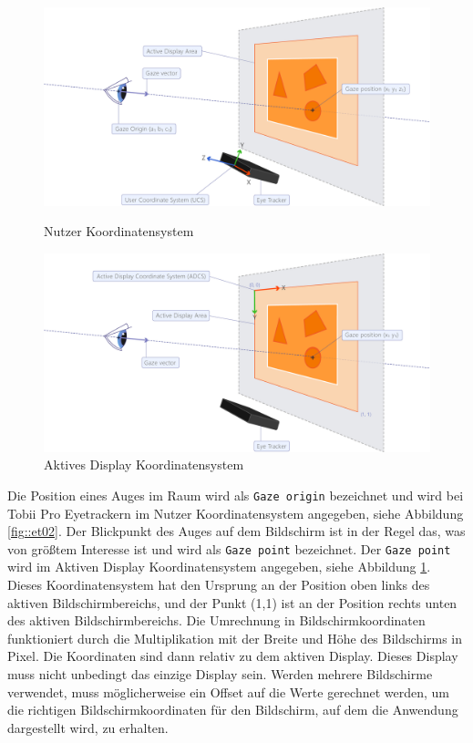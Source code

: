 \begin{figure}[]
	\centering
	\begin{minipage}[b]{0.49\textwidth}
		\centering
		\includegraphics[width=1\textwidth]{../../Grafiken/UCS.png}
		\caption{Nutzer Koordinatensystem \cite{tobiisdk}}
		\label{fig::et02}
	\end{minipage}
	\hfill
	\begin{minipage}[b]{0.49\textwidth}
		\centering
		\includegraphics[width=1\textwidth]{../../Grafiken/ADCS.png}
		\caption{Aktives Display Koordinatensystem \cite{tobiisdk}}
		\label{fig::et03}
	\end{minipage}
\end{figure}
Die Position eines Auges im Raum wird als \texttt{Gaze origin} bezeichnet und wird bei Tobii Pro Eyetrackern im Nutzer Koordinatensystem angegeben, siehe Abbildung \ref{fig::et02}.
Der Blickpunkt des Auges auf dem Bildschirm ist in der Regel das, was von größtem Interesse ist und wird als \texttt{Gaze point} bezeichnet.
Der \texttt{Gaze point} wird im Aktiven Display Koordinatensystem angegeben, siehe Abbildung \ref{fig::et03}.
Dieses Koordinatensystem hat den Ursprung an der Position oben links des aktiven Bildschirmbereichs, und der Punkt (1,1) ist an der Position rechts unten des aktiven Bildschirmbereichs.
Die Umrechnung in Bildschirmkoordinaten funktioniert durch die Multiplikation mit der Breite und Höhe des Bildschirms in Pixel.
Die Koordinaten sind dann relativ zu dem aktiven Display.
Dieses Display muss nicht unbedingt das einzige Display sein.
Werden mehrere Bildschirme verwendet, muss möglicherweise ein Offset auf die Werte gerechnet werden, um die richtigen Bildschirmkoordinaten für den Bildschirm, auf dem die Anwendung dargestellt wird, zu erhalten.

